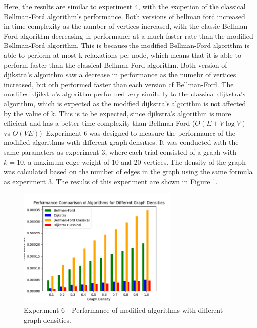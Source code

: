 \documentclass[12pt]{article}
\begin{document}
Here, the results are similar to experiment 4, with the excpetion of the classical Bellman-Ford algorithm's performance.
Both versions of bellman ford increased in time complexity as the number of vertices increased, with the classic Bellman-Ford algorithm decreasing in performance at a much faster rate
than the modified Bellman-Ford algorithm. This is because the modified Bellman-Ford algorithm is able to perform at most k relaxations per node, which means that it is able to perform faster than the classical Bellman-Ford algorithm.
Both version of djikstra's algorithm saw a decrease in performance as the numebr of vertices increased, but oth performed faster than each 
version of Bellman-Ford. The modified djikstra's algorithm performed very similarly to the classical dijkstra's algorithm, which is expected as the modified dijkstra's algorithm is not affected by the value of k.
This is to be expected, since djikstra's algorithm is more efficient and has a better time complexity than Bellman-Ford ($O(E + V \log V)$ vs $O(VE)$).
\smallskip
\newline
\indent
Experiment 6 was designed to measure the performance of the modified algorithms with different graph densities. 
It was conducted with the same parameters as experiment 3, where each trial consisted of a graph with $k=10$, a maximum edge weight of 10 and 20 vertices. The density of the graph was calculated based on the number of edges in the graph using the same formula as experiment 3.
The results of this experiment are shown in Figure \ref{fig:Figure 6}.

\begin{figure}[H] 
    \centering
    \includegraphics[width=0.7\textwidth]{Figures/Performance_densities.png} 
    \caption{\footnotesize Experiment 6 - Performance of modified algorithms with different graph densities.}
    \label{fig:Figure 6} 
\end{figure}
\end{document}
